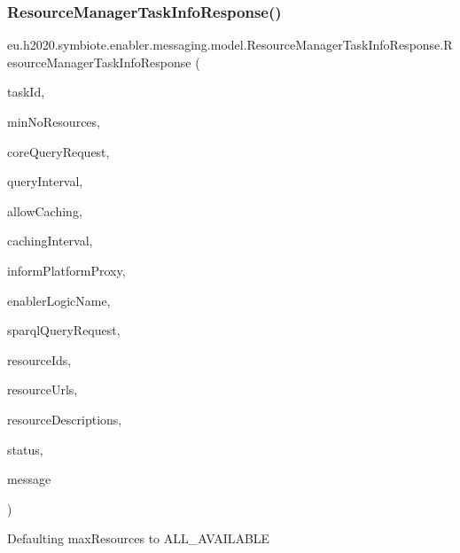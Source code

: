 \subsubsection{\texorpdfstring{Resource\+Manager\+Task\+Info\+Response()}{ResourceManagerTaskInfoResponse()}\hspace{0.1cm}{\footnotesize\ttfamily [1/4]}}
{\footnotesize\ttfamily eu.\+h2020.\+symbiote.\+enabler.\+messaging.\+model.\+Resource\+Manager\+Task\+Info\+Response.\+Resource\+Manager\+Task\+Info\+Response (\begin{DoxyParamCaption}\item[{String}]{task\+Id,  }\item[{Integer}]{min\+No\+Resources,  }\item[{\hyperlink{classeu_1_1h2020_1_1symbiote_1_1core_1_1internal_1_1CoreQueryRequest}{Core\+Query\+Request}}]{core\+Query\+Request,  }\item[{String}]{query\+Interval,  }\item[{Boolean}]{allow\+Caching,  }\item[{String}]{caching\+Interval,  }\item[{Boolean}]{inform\+Platform\+Proxy,  }\item[{String}]{enabler\+Logic\+Name,  }\item[{\hyperlink{classeu_1_1h2020_1_1symbiote_1_1core_1_1ci_1_1SparqlQueryRequest}{Sparql\+Query\+Request}}]{sparql\+Query\+Request,  }\item[{List$<$ String $>$}]{resource\+Ids,  }\item[{Map$<$ String, String $>$}]{resource\+Urls,  }\item[{List$<$ \hyperlink{classeu_1_1h2020_1_1symbiote_1_1core_1_1ci_1_1QueryResourceResult}{Query\+Resource\+Result} $>$}]{resource\+Descriptions,  }\item[{\hyperlink{enumeu_1_1h2020_1_1symbiote_1_1enabler_1_1messaging_1_1model_1_1ResourceManagerTaskInfoResponseStatus}{Resource\+Manager\+Task\+Info\+Response\+Status}}]{status,  }\item[{String}]{message }\end{DoxyParamCaption})}

Defaulting max\+Resources to A\+L\+L\+\_\+\+A\+V\+A\+I\+L\+A\+B\+LE


